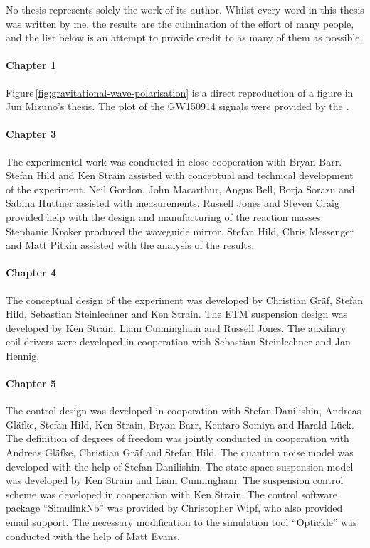 No thesis represents solely the work of its author. Whilst every word in this thesis was written by me, the results are the culmination of the effort of many people, and the list below is an attempt to provide credit to as many of them as possible.

\paragraph{Chapter 1}
Figure\,\ref{fig:gravitational-wave-polarisation} is a direct reproduction of a figure in Jun Mizuno's thesis. The plot of the GW150914 signals were provided by the \LSC{}.

\paragraph{Chapter 3}
The experimental work was conducted in close cooperation with Bryan Barr. Stefan Hild and Ken Strain assisted with conceptual and technical development of the experiment. Neil Gordon, John Macarthur, Angus Bell, Borja Sorazu and Sabina Huttner assisted with measurements. Russell Jones and Steven Craig provided help with the design and manufacturing of the reaction masses. Stephanie Kroker produced the waveguide mirror. Stefan Hild, Chris Messenger and Matt Pitkin assisted with the analysis of the results.

\paragraph{Chapter 4}
The conceptual design of the experiment was developed by Christian Gr\"{a}f, Stefan Hild, Sebastian Steinlechner and Ken Strain. The ETM suspension design was developed by Ken Strain, Liam Cunningham and Russell Jones. The auxiliary coil drivers were developed in cooperation with Sebastian Steinlechner and Jan Hennig.

\paragraph{Chapter 5}
The control design was developed in cooperation with Stefan Danilishin, Andreas Gl\"{a}fke, Stefan Hild, Ken Strain, Bryan Barr, Kentaro Somiya and Harald L\"{u}ck. The definition of degrees of freedom was jointly conducted in cooperation with Andreas Gl\"{a}fke, Christian Gr\"{a}f and Stefan Hild. The quantum noise model was developed with the help of Stefan Danilishin. The state-space suspension model was developed by Ken Strain and Liam Cunningham. The suspension control scheme was developed in cooperation with Ken Strain. The control software package ``SimulinkNb'' was provided by Christopher Wipf, who also provided email support. The necessary modification to the simulation tool ``Optickle'' was conducted with the help of Matt Evans.

